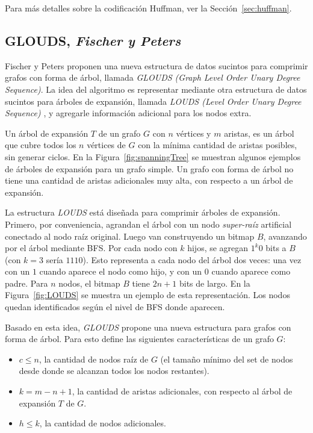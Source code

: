Para más detalles sobre la codificación Huffman, ver la Sección~\ref{sec:huffman}.


\subsection{GLOUDS, \textit{Fischer y Peters}}
Fischer y Peters \cite{fischer2016glouds} proponen una nueva estructura de datos sucintos para comprimir grafos con forma de árbol, llamada \textit{GLOUDS (Graph Level Order Unary Degree Sequence)}. La idea del algoritmo es representar mediante otra estructura de datos sucintos para árboles de expansión, llamada \textit{LOUDS (Level Order Unary Degree Sequence)} \cite{jacobson1989space}, y agregarle información adicional para los nodos extra.





Un árbol de expansión $T$ de un grafo $G$  con $n$ vértices y $m$ aristas, es un árbol que cubre todos los $n$ vértices de $G$ con la mínima cantidad de aristas posibles, sin generar ciclos. En la Figura~\ref{fig:spanningTree} se muestran algunos ejemplos de árboles de expansión para un grafo simple. Un grafo con forma de árbol no tiene una cantidad de aristas adicionales muy alta, con respecto a un árbol de expansión.

La estructura \textit{LOUDS} \cite{jacobson1989space} está diseñada para comprimir árboles de expansión. Primero, por conveniencia, agrandan el árbol con un nodo \textit{super-raíz} artificial conectado al nodo raíz original. Luego van construyendo un bitmap $B$, avanzando por el árbol mediante BFS. Por cada nodo con $k$ hijos, se agregan $1^{k}0$ bits a $B$ (con $k=3$ sería $1110$). Esto representa a cada nodo del árbol dos veces: una vez con un $1$ cuando aparece el nodo como hijo, y con un $0$ cuando aparece como padre. Para $n$ nodos, el bitmap $B$ tiene $2n + 1$ bits de largo. En la Figura~\ref{fig:LOUDS} se muestra un ejemplo de esta representación. Los nodos quedan identificados según el nivel de BFS donde aparecen.

Basado en esta idea, \textit{GLOUDS} \cite{fischer2016glouds} propone una nueva estructura para grafos con forma de árbol. Para esto define las siguientes características de un grafo $G$:

\begin{itemize}
	\item $c \leq n$, la cantidad de nodos raíz de $G$ (el tamaño mínimo del set de nodos desde donde se alcanzan todos los nodos restantes). 
	\item $k = m - n + 1$, la cantidad de aristas adicionales, con respecto al árbol de expansión $T$ de $G$.
	\item $h \leq k$, la cantidad de nodos adicionales.
\end{itemize}

